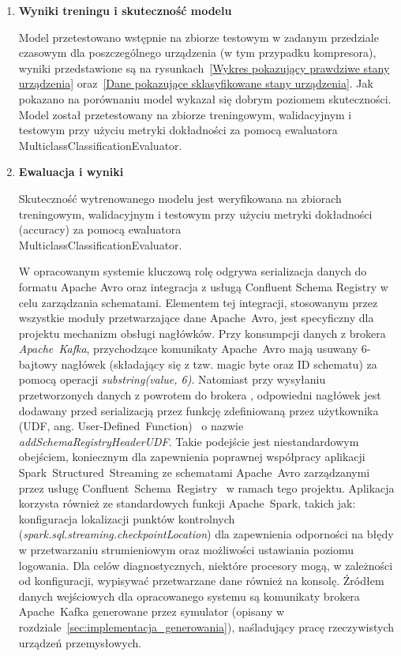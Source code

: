 \begin{enumerate}
    \item \textbf{Wyniki treningu i skuteczność modelu}

Model przetestowano wstępnie na zbiorze testowym w zadanym przedziale czasowym dla poszczególnego urządzenia (w tym przypadku kompresora), wyniki przedstawione są na rysunkach~\ref{Wykres pokazujący prawdziwe stany urządzenia} oraz~\ref{Dane pokazujące sklasyfikowane stany urządzenia}. Jak pokazano na porównaniu model wykazał się dobrym poziomem skuteczności. Model został przetestowany na zbiorze treningowym, walidacyjnym i testowym przy użyciu metryki dokładności za pomocą ewaluatora MulticlassClassificationEvaluator. 


\label{fig:prawdziwe_stany}

\label{fig:sklasyfikowane_stany}

    \item \textbf{Ewaluacja i wyniki}

Skuteczność wytrenowanego modelu jest weryfikowana na zbiorach treningowym, walidacyjnym i testowym przy użyciu metryki dokładności (accuracy) za pomocą ewaluatora \\ MulticlassClassificationEvaluator.

W opracowanym systemie kluczową rolę odgrywa serializacja danych do formatu Apache Avro oraz integracja z usługą Confluent Schema Registry w celu zarządzania schematami. Elementem tej integracji, stosowanym przez wszystkie moduły przetwarzające dane \mbox{Apache Avro}, jest specyficzny dla projektu mechanizm obsługi nagłówków. Przy konsumpcji danych z brokera \mbox{\textit{{Apache Kafka}}}, przychodzące komunikaty \mbox{Apache Avro} mają usuwany 6-bajtowy nagłówek (składający się z tzw. magic byte oraz ID schematu) za pomocą operacji \textit{substring(value, 6)}. Natomiast przy wysyłaniu przetworzonych danych z powrotem do brokera \mbox{}, odpowiedni nagłówek jest dodawany przed serializacją przez funkcję zdefiniowaną przez użytkownika (UDF, ang. \mbox{User-Defined Function})~\cite{spark_udf} o nazwie \textit{addSchemaRegistryHeaderUDF}. Takie podejście jest niestandardowym obejściem, koniecznym dla zapewnienia poprawnej współpracy aplikacji \mbox{Spark Structured Streaming} ze schematami \mbox{Apache Avro} zarządzanymi przez usługę \mbox{Confluent Schema Registry}~\cite{confluent_schema_registry} w ramach tego projektu. Aplikacja korzysta również ze standardowych funkcji \mbox{Apache Spark}, takich jak: konfiguracja lokalizacji punktów kontrolnych (\textit{spark.sql.streaming.checkpointLocation}) dla zapewnienia odporności na błędy w przetwarzaniu strumieniowym oraz możliwości ustawiania poziomu logowania. Dla celów diagnostycznych, niektóre procesory mogą, w zależności od konfiguracji, wypisywać przetwarzane dane również na konsolę. Źródłem danych wejściowych dla opracowanego systemu są komunikaty brokera \mbox{Apache Kafka} generowane przez symulator (opisany w rozdziale~\ref{sec:implementacja_generowania}), naśladujący pracę rzeczywistych urządzeń przemysłowych.

\end{enumerate}